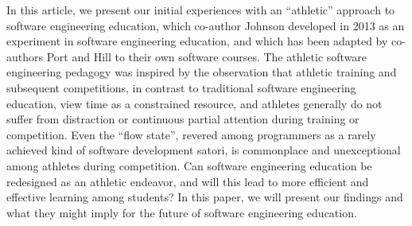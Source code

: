 In this article, we present our initial experiences with an ``athletic'' approach to software engineering education, which co-author Johnson developed in 2013 as an experiment in software engineering education, and which has been adapted by co-authors Port and Hill to their own software courses. The athletic software engineering pedagogy was inspired by the observation that athletic training and subsequent competitions, in contrast to traditional software engineering education, view time as a constrained resource, and athletes generally do not suffer from distraction or continuous partial attention during training or competition.  Even the ``flow state'', revered among programmers as a rarely achieved kind of software development satori, is  commonplace and unexceptional among athletes during competition. Can software engineering education be redesigned as an athletic endeavor, and will this lead to more efficient and effective learning among students?  In this paper, we will present our findings and what they might imply for the future of software engineering education. 









 